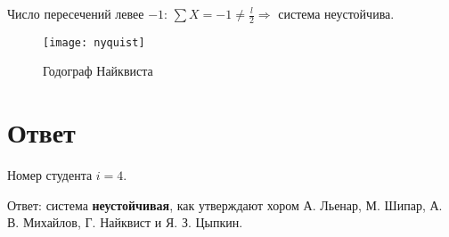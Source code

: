 \documentclass[a4paper,12pt]{article}
\newcommand{\myPictWidth}{.95\textwidth}
\begin{document}
Число пересечений левее $ -1 $: $ \sum X = -1 \ne \frac{l}{2} \Rightarrow $ система неустойчива.

\begin{figure}[H]
    \centering \texttt{[image: nyquist]}
    \caption{Годограф Найквиста}
    \label{fig:nyquist}
\end{figure}

\section{ Ответ }

Номер студента $ i = 4 $.

Ответ: система \textbf{неустойчивая}, как утверждают хором А. Льенар, М. Шипар, А. В. Михайлов, Г. Найквист и Я. З. Цыпкин.
\end{document}
